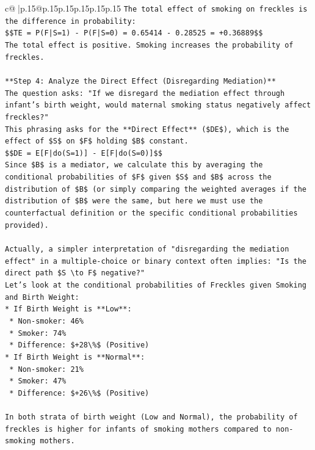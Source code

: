 \documentclass{article}
\begin{document}
{\begin{supertabular}{c@{$\;$}|p{.15\linewidth}@{}p{.15\linewidth}p{.15\linewidth}p{.15\linewidth}p{.15\linewidth}p{.15\linewidth}}
{{{\texttt{The total effect of smoking on freckles is the difference in probability:} \\
\texttt{\$\$TE = P(F|S=1) {-} P(F|S=0) = 0.65414 {-} 0.28525 = +0.36889\$\$} \\
\texttt{The total effect is positive. Smoking increases the probability of freckles.} \\
\\ 
\texttt{**Step 4: Analyze the Direct Effect (Disregarding Mediation)**} \\
\texttt{The question asks: "If we disregard the mediation effect through infant's birth weight, would maternal smoking status negatively affect freckles?"} \\
\texttt{This phrasing asks for the **Direct Effect** (\$DE\$), which is the effect of \$S\$ on \$F\$ holding \$B\$ constant.} \\
\texttt{\$\$DE = E{[}F|do(S=1){]} {-} E{[}F|do(S=0){]}\$\$} \\
\texttt{Since \$B\$ is a mediator, we calculate this by averaging the conditional probabilities of \$F\$ given \$S\$ and \$B\$ across the distribution of \$B\$ (or simply comparing the weighted averages if the distribution of \$B\$ were the same, but here we must use the counterfactual definition or the specific conditional probabilities provided).} \\
\\ 
\texttt{Actually, a simpler interpretation of "disregarding the mediation effect" in a multiple{-}choice or binary context often implies: "Is the direct path \$S \textbackslash{}to F\$ negative?"} \\
\texttt{Let's look at the conditional probabilities of Freckles given Smoking and Birth Weight:} \\
\texttt{*   If Birth Weight is **Low**:} \\
\texttt{    *   Non{-}smoker: 46\%} \\
\texttt{    *   Smoker: 74\%} \\
\texttt{    *   Difference: \$+28\textbackslash{}\%\$ (Positive)} \\
\texttt{*   If Birth Weight is **Normal**:} \\
\texttt{    *   Non{-}smoker: 21\%} \\
\texttt{    *   Smoker: 47\%} \\
\texttt{    *   Difference: \$+26\textbackslash{}\%\$ (Positive)} \\
\\ 
\texttt{In both strata of birth weight (Low and Normal), the probability of freckles is higher for infants of smoking mothers compared to non{-}smoking mothers.} \\
}}}
\end{supertabular}}
\end{document}
